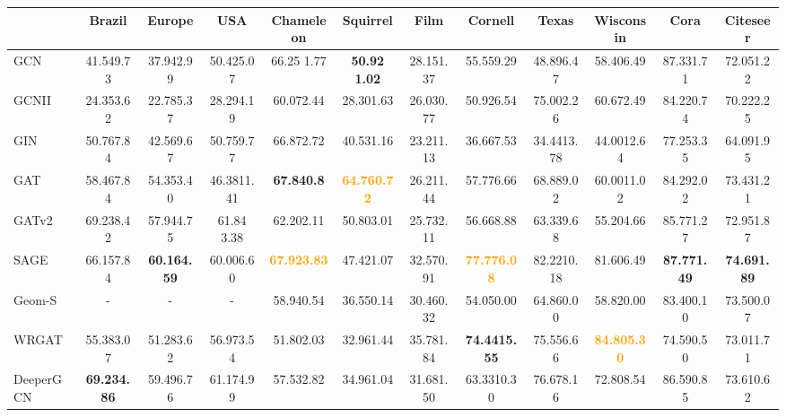 \documentclass[oneside]{article}
\begin{document}
\begin{table*}[t]
\fontsize{22 pt}{28 pt}\selectfont
\begin{adjustbox}{width=1\textwidth}

  \begin{tabular}{l ccc cccccccc}
    \toprule
     &Brazil & Europe & USA&Chameleon & Squirrel & Film & Cornell & Texas & Wisconsin & Cora & Citeseer  \\\hline \hline
    GCN & 41.549.73 &  37.942.99& 50.425.07   & 66.25 1.77 & \textbf{50.92 1.02}&28.151.37 & 55.559.29 & 48.896.47 & 58.406.49 & 87.331.71 & 72.051.22 \\
    
    GCNII& 24.353.62 &  22.785.37 &28.294.19&60.072.44& 28.301.63& 26.030.77&  50.926.54& 75.002.26& 60.672.49& 84.220.74& 70.222.25 \\
    
     GIN &  50.767.84 &  42.569.67 & 50.759.77  & 66.872.72  & 40.531.16 & 23.211.13 & 36.667.53 &34.4413.78 & 44.0012.64 & 77.253.35 & 64.091.95 \\
    
    GAT & 58.467.84&  54.353.40 & 46.3811.41   & \textbf{67.840.8} & \textcolor{orange}{\textbf{64.760.72}}& 26.211.44 & 57.776.66 & 68.889.02 & 60.0011.02 & 84.292.02 & 73.431.21 \\
    
    GATv2 &{ 69.238.42} & 57.944.75 & 61.84 3.38  & 62.202.11 & 50.803.01 & 25.732.11 & 56.668.88 &  63.339.68 & 55.204.66 & 85.771.27& 72.951.87 \\
    
    SAGE & 66.157.84& \textbf{60.164.59} & 60.006.60 & \textcolor{orange}{\textbf{67.923.83}} & 47.421.07 &32.570.91 &\textcolor{orange}{\textbf{77.776.08}}& 82.2210.18 &81.606.49 &\textbf{87.771.49} & \textbf{74.691.89} \\
    
    Geom-S & - & - &-  & 58.940.54  & 36.550.14 &30.460.32 & 54.050.00 & 64.860.00&58.820.00 & 83.400.10 & 73.500.07 \\
    
    WRGAT & 55.383.07 &  51.283.62 &  56.973.54 & 51.802.03 & 32.961.44 & 35.781.84 &\textbf{74.4415.55} & 75.556.66 &\textcolor{orange}{\textbf{84.805.30}}& 74.590.50 & 73.011.71 \\
    


    DeeperGCN & \textbf{69.234.86}&  59.496.76 & 61.174.99  & 57.532.82 &34.961.04&31.681.50 & 63.3310.30 &76.678.16& 72.808.54 & 86.590.85 & 73.610.62 \\\hline
    

\end{tabular}
\end{adjustbox}
\end{table*}
\end{document}

